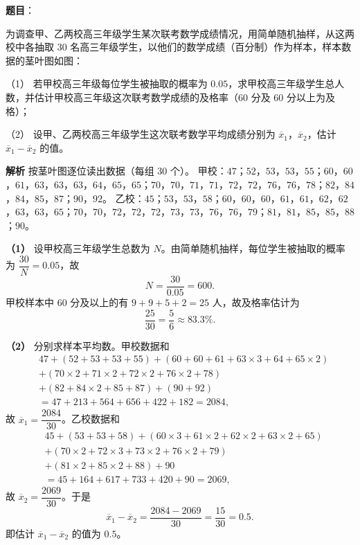 \begin{answer}

\textbf{题目}：

为调查甲、乙两校高三年级学生某次联考数学成绩情况，用简单随机抽样，从这两校中各抽取 $30$ 名高三年级学生，以他们的数学成绩（百分制）作为样本，样本数据的茎叶图如图：
\nopagebreak[4]
\begin{center}\end{center}
\nopagebreak[4]
（1） 若甲校高三年级每位学生被抽取的概率为 $0.05$，求甲校高三年级学生总人数，并估计甲校高三年级这次联考数学成绩的及格率（$60$ 分及 $60$ 分以上为及格）；

（2） 设甲、乙两校高三年级学生这次联考数学平均成绩分别为 $\overline{x}_1$，$\overline{x}_2$，估计 $\overline{x}_1-\overline{x}_2$ 的值。

\textbf{解析}
按茎叶图逐位读出数据（每组 $30$ 个）。
甲校：$47$；$52$，$53$，$53$，$55$；$60$，$60$，$61$，$63$，$63$，$63$，$64$，$65$，$65$；$70$，$70$，$71$，$71$，$72$，$72$，$76$，$76$，$78$；$82$，$84$，$84$，$85$，$87$；$90$，$92$。
乙校：$45$；$53$，$53$，$58$；$60$，$60$，$60$，$61$，$61$，$62$，$62$，$63$，$63$，$65$；$70$，$70$，$72$，$72$，$72$，$73$，$73$，$76$，$76$，$79$；$81$，$81$，$85$，$85$，$88$；$90$。

\textbf{（1）} 设甲校高三年级学生总数为 $N$。由简单随机抽样，每位学生被抽取的概率为 $\dfrac{30}{N}=0.05$，故
\nopagebreak[4]
\[N=\frac{30}{0.05}=600.\]
甲校样本中 $60$ 分及以上的有 $9+9+5+2=25$ 人，故及格率估计为
\nopagebreak[4]
\[\frac{25}{30}=\frac56\approx83.3\%.\]

\textbf{（2）} 分别求样本平均数。甲校数据和
\nopagebreak[4]
\[\begin{aligned}
&47+(52+53+53+55)+(60+60+61+63\times3+64+65\times2)\\
&+(70\times2+71\times2+72\times2+76\times2+78)\\
&+(82+84\times2+85+87)+(90+92)\\
&=47+213+564+656+422+182=2084,
\end{aligned}\]
故 $\overline{x}_1=\dfrac{2084}{30}$。乙校数据和
\nopagebreak[4]
\[\begin{aligned}
&45+(53+53+58)+(60\times3+61\times2+62\times2+63\times2+65)\\
&+(70\times2+72\times3+73\times2+76\times2+79)\\
&+(81\times2+85\times2+88)+90\\
&=45+164+617+733+420+90=2069,
\end{aligned}\]
故 $\overline{x}_2=\dfrac{2069}{30}$。于是
\nopagebreak[4]
\[\overline{x}_1-\overline{x}_2=\frac{2084-2069}{30}=\frac{15}{30}=0.5.\]
即估计 $\overline{x}_1-\overline{x}_2$ 的值为 $0.5$。



\end{answer}

